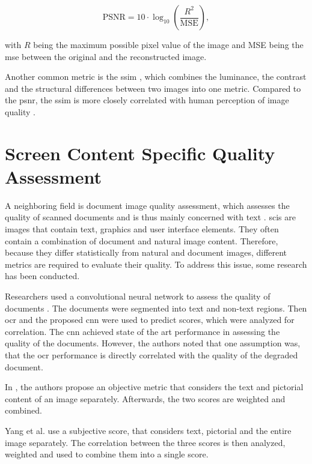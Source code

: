 \begin{equation}
    \text{PSNR} = 10 \cdot \log_{10} \left( \frac{R^2}{\text{MSE}} \right),
    \label{eq:psnr}
\end{equation}

with \(R\) being the maximum possible pixel value of the image and MSE being the \gls{mse} between the original and the reconstructed image.

Another common metric is the \gls{ssim} \cite{SSIM_2004}, which combines the luminance, the contrast and the structural differences between two images into one metric.
Compared to the \gls{psnr}, the \gls{ssim} is more closely correlated with human perception of image quality \cite{frmetric_comp_2012}.



\section{Screen Content Specific Quality Assessment}

A neighboring field is document image quality assessment, which assesses the quality of scanned documents and is thus mainly concerned with text \cite{3_subj_weight_2015}.
\Glspl{sci} are images that contain text, graphics and user interface elements.
They often contain a combination of document and natural image content.
Therefore, because they differ statistically from natural and document images, different metrics are required to evaluate their quality.
To address this issue, some research has been conducted.

Researchers used a convolutional neural network to assess the quality of documents \cite{ocr_cnn_docu_2014}.
The documents were segmented into text and non-text regions.
Then \gls{ocr} and the proposed \gls{cnn} were used to predict scores, which were analyzed for correlation.
The \gls{cnn} achieved state of the art performance in assessing the quality of the documents.
However, the authors noted that one assumption was, that the \gls{ocr} performance is directly correlated with the quality of the degraded document.

In \cite{text_pict_weight_2017}, the authors propose an objective metric that considers the text and pictorial content of an image separately.
Afterwards, the two scores are weighted and combined.

Yang et al. \cite{3_subj_weight_2015} use a subjective score, that considers text, pictorial and the entire image separately.
The correlation between the three scores is then analyzed, weighted and used to combine them into a single score.

